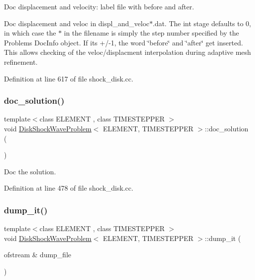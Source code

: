 Doc displacement and velocity\+: label file with before and after. 

Doc displacement and veloc in displ\+\_\+and\+\_\+veloc$\ast$.dat. The int stage defaults to 0, in which case the \textquotesingle{}$\ast$\textquotesingle{} in the filename is simply the step number specified by the Problem\textquotesingle{}s Doc\+Info object. If it\textquotesingle{}s +/-\/1, the word \char`\"{}before\char`\"{} and \char`\"{}after\char`\"{} get inserted. This allows checking of the veloc/displacment interpolation during adaptive mesh refinement. 

Definition at line 617 of file shock\+\_\+disk.\+cc.

\mbox{\label{classDiskShockWaveProblem_a7685309caac199d18f3f81468d9fcb23}} 
\subsubsection{\texorpdfstring{doc\+\_\+solution()}{doc\_solution()}}
{\footnotesize\ttfamily template$<$class E\+L\+E\+M\+E\+NT , class T\+I\+M\+E\+S\+T\+E\+P\+P\+ER $>$ \\
void \hyperlink{classDiskShockWaveProblem}{Disk\+Shock\+Wave\+Problem}$<$ E\+L\+E\+M\+E\+NT, T\+I\+M\+E\+S\+T\+E\+P\+P\+ER $>$\+::doc\+\_\+solution (\begin{DoxyParamCaption}{ }\end{DoxyParamCaption})}



Doc the solution. 



Definition at line 478 of file shock\+\_\+disk.\+cc.

\mbox{\label{classDiskShockWaveProblem_a2eaf91d3e0eb5f37b9920fc3d9d54cb9}} 
\subsubsection{\texorpdfstring{dump\+\_\+it()}{dump\_it()}}
{\footnotesize\ttfamily template$<$class E\+L\+E\+M\+E\+NT , class T\+I\+M\+E\+S\+T\+E\+P\+P\+ER $>$ \\
void \hyperlink{classDiskShockWaveProblem}{Disk\+Shock\+Wave\+Problem}$<$ E\+L\+E\+M\+E\+NT, T\+I\+M\+E\+S\+T\+E\+P\+P\+ER $>$\+::dump\+\_\+it (\begin{DoxyParamCaption}\item[{ofstream \&}]{dump\+\_\+file }\end{DoxyParamCaption})}



